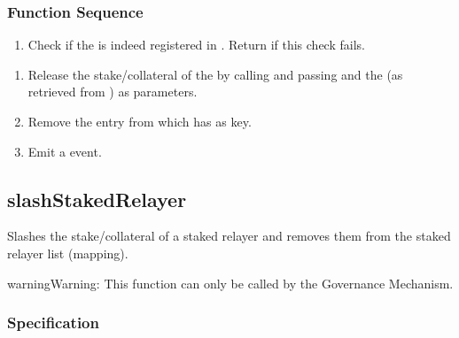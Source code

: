 \documentclass[a4paper,10pt,english]{sphinxmanual}
\begin{document}
\subsubsection{Function Sequence}
\label{\detokenize{spec/staked-relayers:id6}}\begin{enumerate}
%
\item {} 
Check if the  is indeed registered in . Return  if this check fails.

\end{enumerate}
\begin{enumerate}
%
\setcounter{enumi}{2}
\item {} 
Release the stake/collateral of the  by calling {\hyperref[\detokenize{spec/collateral:lockcollateral}]{}} and passing  and the  (as retrieved from ) as parameters.

\item {} 
Remove the entry from  which has  as key.

\item {} 
Emit a  event.

\end{enumerate}


\subsection{slashStakedRelayer}
\label{\detokenize{spec/staked-relayers:slashstakedrelayer}}\label{\detokenize{spec/staked-relayers:id7}}
Slashes the stake/collateral of a staked relayer and removes them from the staked relayer list (mapping).

\begin{sphinxadmonition}{warning}{Warning:}
This function can only be called by the Governance Mechanism.
\end{sphinxadmonition}


\subsubsection{Specification}
\label{\detokenize{spec/staked-relayers:id8}}
\end{document}
